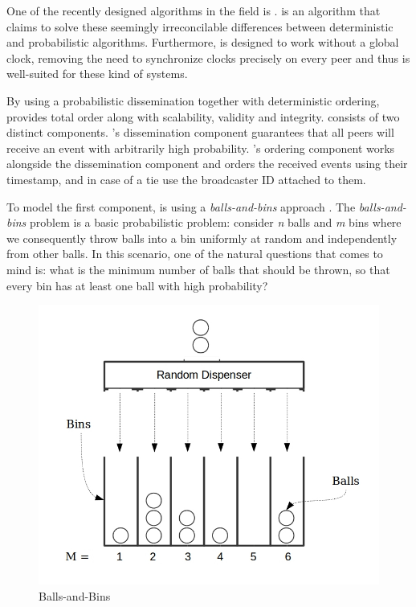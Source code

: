 One of the recently designed algorithms in the field is \epto \autocite{matos2015epto}. \epto is an algorithm that claims to solve these seemingly irreconcilable
differences between deterministic and probabilistic algorithms. Furthermore, \epto is designed to work without a global clock, removing the need to synchronize clocks precisely on every peer and thus is well-suited for these kind of systems.
\par
By using a probabilistic dissemination together with deterministic ordering, \epto provides total order along with scalability, validity and integrity. \epto consists of two distinct components. \epto's dissemination component guarantees that all peers will receive an event with arbitrarily high probability. \epto's ordering component works alongside the dissemination component and orders the received events using their timestamp, and in case of a tie use the broadcaster ID attached to them.
\par
To model the first component, \epto is using a \textit{balls-and-bins} approach \autocite{Koldehofe02simplegossiping}. The \textit{balls-and-bins} problem is a basic probabilistic problem: consider \textit{n} balls and \textit{m} bins where we consequently throw balls into a bin uniformly at random and independently from other balls. In this scenario, one of the natural questions that comes to mind is: what is the minimum number of balls that should be thrown, so that every bin has at least one ball with high probability?
\begin{figure}
	\includegraphics[width=\linewidth]{figures/BnB.jpeg}
	\caption[Caption]{Balls-and-Bins\footnotemark}
	\label{fig:balls-and-bins}
\end{figure}
